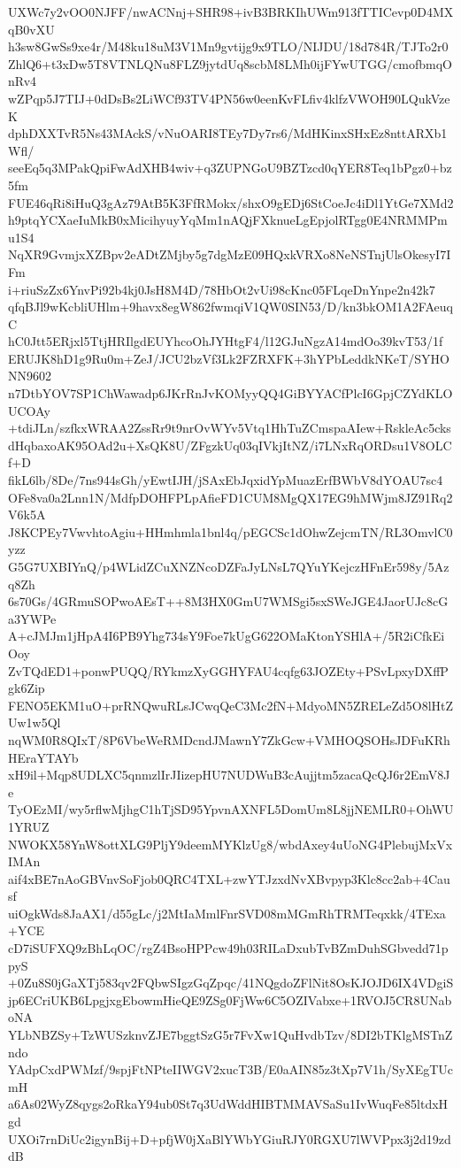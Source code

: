 UXWc7y2vOO0NJFF/nwACNnj+SHR98+ivB3BRKIhUWm913fTTICevp0D4MXqB0vXU
h3sw8GwSs9xe4r/M48ku18uM3V1Mn9gvtijg9x9TLO/NIJDU/18d784R/TJTo2r0
ZhlQ6+t3xDw5T8VTNLQNu8FLZ9jytdUq8scbM8LMh0ijFYwUTGG/cmofbmqOnRv4
wZPqp5J7TIJ+0dDsBs2LiWCf93TV4PN56w0eenKvFLfiv4klfzVWOH90LQukVzeK
dphDXXTvR5Ns43MAckS/vNuOARI8TEy7Dy7rs6/MdHKinxSHxEz8nttARXb1Wfl/
seeEq5q3MPakQpiFwAdXHB4wiv+q3ZUPNGoU9BZTzcd0qYER8Teq1bPgz0+bz5fm
FUE46qRi8iHuQ3gAz79AtB5K3FfRMokx/shxO9gEDj6StCoeJc4iDl1YtGe7XMd2
h9ptqYCXaeIuMkB0xMicihyuyYqMm1nAQjFXknueLgEpjolRTgg0E4NRMMPmu1S4
NqXR9GvmjxXZBpv2eADtZMjby5g7dgMzE09HQxkVRXo8NeNSTnjUlsOkesyI7IFm
i+riuSzZx6YnvPi92b4kj0JsH8M4D/78HbOt2vUi98cKnc05FLqeDnYnpe2n42k7
qfqBJl9wKcbliUHlm+9havx8egW862fwmqiV1QW0SIN53/D/kn3bkOM1A2FAeuqC
hC0Jtt5ERjxl5TtjHRIlgdEUYhcoOhJYHtgF4/l12GJuNgzA14mdOo39kvT53/1f
ERUJK8hD1g9Ru0m+ZeJ/JCU2bzVf3Lk2FZRXFK+3hYPbLeddkNKeT/SYHONN9602
n7DtbYOV7SP1ChWawadp6JKrRnJvKOMyyQQ4GiBYYACfPlcI6GpjCZYdKLOUCOAy
+tdiJLn/szfkxWRAA2ZssRr9t9nrOvWYv5Vtq1HhTuZCmspaAIew+RskleAc5cks
dHqbaxoAK95OAd2u+XsQK8U/ZFgzkUq03qIVkjItNZ/i7LNxRqORDsu1V8OLCf+D
fikL6lb/8De/7ns944sGh/yEwtIJH/jSAxEbJqxidYpMuazErfBWbV8dYOAU7sc4
OFe8va0a2Lnn1N/MdfpDOHFPLpAfieFD1CUM8MgQX17EG9hMWjm8JZ91Rq2V6k5A
J8KCPEy7VwvhtoAgiu+HHmhmla1bnl4q/pEGCSc1dOhwZejcmTN/RL3OmvlC0yzz
G5G7UXBIYnQ/p4WLidZCuXNZNcoDZFaJyLNsL7QYuYKejczHFnEr598y/5Azq8Zh
6s70Gs/4GRmuSOPwoAEsT++8M3HX0GmU7WMSgi5sxSWeJGE4JaorUJc8cGa3YWPe
A+cJMJm1jHpA4I6PB9Yhg734sY9Foe7kUgG622OMaKtonYSHlA+/5R2iCfkEiOoy
ZvTQdED1+ponwPUQQ/RYkmzXyGGHYFAU4cqfg63JOZEty+PSvLpxyDXffPgk6Zip
FENO5EKM1uO+prRNQwuRLsJCwqQeC3Mc2fN+MdyoMN5ZRELeZd5O8lHtZUw1w5Ql
nqWM0R8QIxT/8P6VbeWeRMDcndJMawnY7ZkGcw+VMHOQSOHsJDFuKRhHEraYTAYb
xH9il+Mqp8UDLXC5qnmzlIrJIizepHU7NUDWuB3cAujjtm5zacaQcQJ6r2EmV8Je
TyOEzMI/wy5rflwMjhgC1hTjSD95YpvnAXNFL5DomUm8L8jjNEMLR0+OhWU1YRUZ
NWOKX58YnW8ottXLG9PljY9deemMYKlzUg8/wbdAxey4uUoNG4PlebujMxVxIMAn
aif4xBE7nAoGBVnvSoFjob0QRC4TXL+zwYTJzxdNvXBvpyp3Klc8cc2ab+4Causf
uiOgkWds8JaAX1/d55gLc/j2MtIaMmlFnrSVD08mMGmRhTRMTeqxkk/4TExa+YCE
cD7iSUFXQ9zBhLqOC/rgZ4BsoHPPcw49h03RILaDxubTvBZmDuhSGbvedd71ppyS
+0Zu8S0jGaXTj583qv2FQbwSIgzGqZpqc/41NQgdoZFlNit8OsKJOJD6IX4VDgiS
jp6ECriUKB6LpgjxgEbowmHieQE9ZSg0FjWw6C5OZIVabxe+1RVOJ5CR8UNaboNA
YLbNBZSy+TzWUSzknvZJE7bggtSzG5r7FvXw1QuHvdbTzv/8DI2bTKlgMSTnZndo
YAdpCxdPWMzf/9spjFtNPteIIWGV2xucT3B/E0aAIN85z3tXp7V1h/SyXEgTUcmH
a6As02WyZ8qygs2oRkaY94ub0St7q3UdWddHIBTMMAVSaSu1IvWuqFe85ltdxHgd
UXOi7rnDiUc2igynBij+D+pfjW0jXaBlYWbYGiuRJY0RGXU7lWVPpx3j2d19zddB
